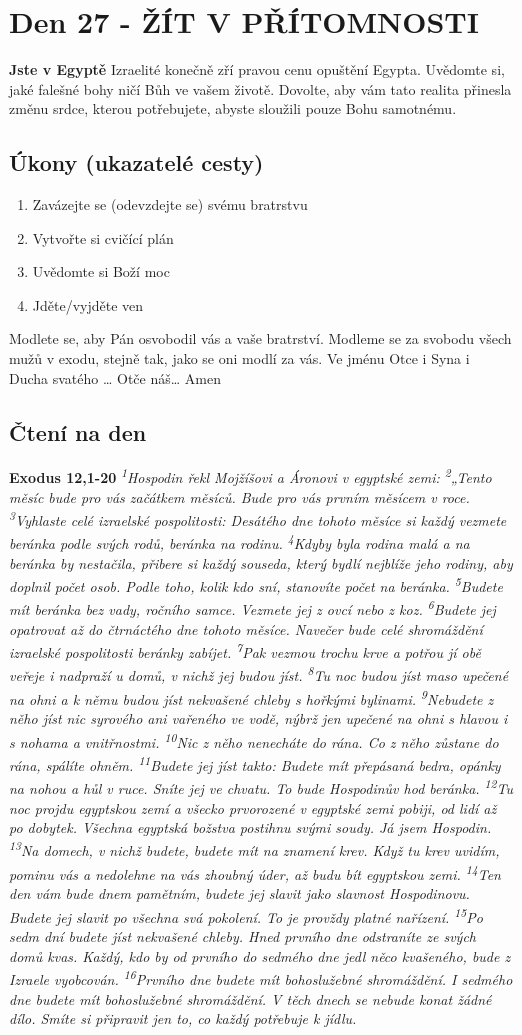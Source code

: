 \documentclass[11pt]{article}
\newcommand{\zacatekCtvrtyTyden}{
  \textbf{Jste v Egyptě} \newline
  Izraelité konečně zří pravou cenu opuštění Egypta. Uvědomte si, jaké falešné bohy ničí Bůh ve vašem životě.
Dovolte, aby vám tato realita přinesla změnu srdce, kterou potřebujete, abyste sloužili pouze Bohu samotnému.

\subsection*{Úkony (ukazatelé cesty)}
\begin{enumerate}
  \item Zavázejte se (odevzdejte se) svému bratrstvu
  \item Vytvořte si cvičící plán
  \item Uvědomte si Boží moc
  \item Jděte/vyjděte ven
\end{enumerate}
Modlete se, aby Pán osvobodil vás a vaše bratrství. \newline
Modleme se za svobodu všech mužů v exodu, stejně tak, jako se oni modlí za vás.\newline
Ve jménu Otce i Syna i Ducha svatého …  Otče náš… Amen
}
\begin{document}
\newpage
\section{Den 27 - ŽÍT V PŘÍTOMNOSTI}
\zacatekCtvrtyTyden
\subsection*{Čtení na den}
\textbf{Exodus 12,1-20}
\newline
\textit{
\textsuperscript{1}Hospodin řekl Mojžíšovi a Áronovi v egyptské zemi:
\textsuperscript{2}„Tento měsíc bude pro vás začátkem měsíců. Bude pro vás prvním měsícem v roce.
\textsuperscript{3}Vyhlaste celé izraelské pospolitosti: Desátého dne tohoto měsíce si každý vezmete beránka podle svých rodů, beránka na rodinu.
\textsuperscript{4}Kdyby byla rodina malá a na beránka by nestačila, přibere si každý souseda, který bydlí nejblíže jeho rodiny, aby doplnil počet osob. Podle toho, kolik kdo sní, stanovíte počet na beránka.
\textsuperscript{5}Budete mít beránka bez vady, ročního samce. Vezmete jej z ovcí nebo z koz.
\textsuperscript{6}Budete jej opatrovat až do čtrnáctého dne tohoto měsíce. Navečer bude celé shromáždění izraelské pospolitosti beránky zabíjet.
\textsuperscript{7}Pak vezmou trochu krve a potřou jí obě veřeje i nadpraží u domů, v nichž jej budou jíst.
\textsuperscript{8}Tu noc budou jíst maso upečené na ohni a k němu budou jíst nekvašené chleby s hořkými bylinami.
\textsuperscript{9}Nebudete z něho jíst nic syrového ani vařeného ve vodě, nýbrž jen upečené na ohni s hlavou i s nohama a vnitřnostmi.
\textsuperscript{10}Nic z něho nenecháte do rána. Co z něho zůstane do rána, spálíte ohněm.
\textsuperscript{11}Budete jej jíst takto: Budete mít přepásaná bedra, opánky na nohou a hůl v ruce. Sníte jej ve chvatu. To bude Hospodinův hod beránka.
\textsuperscript{12}Tu noc projdu egyptskou zemí a všecko prvorozené v egyptské zemi pobiji, od lidí až po dobytek. Všechna egyptská božstva postihnu svými soudy. Já jsem Hospodin.
\textsuperscript{13}Na domech, v nichž budete, budete mít na znamení krev. Když tu krev uvidím, pominu vás a nedolehne na vás zhoubný úder, až budu bít egyptskou zemi.
\textsuperscript{14}Ten den vám bude dnem pamětním, budete jej slavit jako slavnost Hospodinovu. Budete jej slavit po všechna svá pokolení. To je provždy platné nařízení.
\textsuperscript{15}Po sedm dní budete jíst nekvašené chleby. Hned prvního dne odstraníte ze svých domů kvas. Každý, kdo by od prvního do sedmého dne jedl něco kvašeného, bude z Izraele vyobcován.
\textsuperscript{16}Prvního dne budete mít bohoslužebné shromáždění. I sedmého dne budete mít bohoslužebné shromáždění. V těch dnech se nebude konat žádné dílo. Smíte si připravit jen to, co každý potřebuje k jídlu.
}
\end{document}
